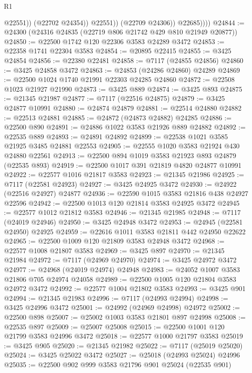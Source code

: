 \begin{lexlean}{R1}
\begin{coremodule}
                        @22551))
                    (@22702 @24354))
                  @22551))
              (@22709 @24306))
            @22685))))
@24844 := @24300 (@24316 @24835 (@22719 @806 @21742 @429 @810 @21949 @20877))
@24850 := @22500 @1742 @120 @22306 @3583 @24289 @3472
@24853 := @22358 @1741 @22304 @3583
@24854 := @20895 @22415
@24855 := @3425 @24854
@24856 := @22380 @22481
@24858 := @7117 (@24855 @24856)
@24860 := @3425 @24858 @3472
@24863 := @24853 (@24286 @24860) @24289
@24869 := @22500 @1024 @1740 @21991 @22303 @24285 @24860
@24872 := @22508 @1023 @21927 @21990
@24873 := @3425 @889
@24874 := @3425 @893
@24875 := @21345 @21987
@24877 := @7117 (@22516 @24875)
@24879 := @3425 @24877 @10991
@24880 := @24874 @24879
@24881 := @22514 @24880
@24882 := @22513 @24881
@24885 := @24872 (@24873 @24882) @24285
@24886 := @22500 @890
@24891 := @24886 @1022 @3583 @21926 @889 @24882
@24892 := @22535 @889
@24893 := @24891 @24892
@24899 := @22538 @1021 @3585 @21925 @3485 @24881 @22553
@24905 := @22555 @1020 @3583 @21924 @430 @24880 @22561
@24913 := @22500 @894 @1019 @3583 @21923 @893 @24879 (@22535 @893)
@24919 := @22500 @1017 @391 @21819 @4820 @24877 @10991
@24922 := @22577 @1016 @21817 @3583
@24923 := @21345 @21986
@24925 := @7117 (@22581 @24923)
@24927 := @3425 @24925 @3472
@24930 := @24922 (@22516 @24927) @24877
@24936 := @22590 @1015 @3583 @21816 @438 @24927 @22596
@24942 := @22500 @1013 @120 @21814 @3583 @24925 @3472
@24945 := @22577 @1012 @21812 @3583
@24946 := @21345 @21985
@24948 := @7117 (@24019 @24946)
@24950 := @3425 @24948 @3472
@24953 := @24945 (@22581 @24950) @24925
@24959 := @22616 @1011 @3583 @21811 @442 @24950 @22622
@24965 := @22500 @1009 @120 @21809 @3583 @24948 @3472
@24968 := @22577 @1008 @21807 @3583
@24969 := @3425 @897
@24970 := @21345 @21984
@24972 := @7117 (@24969 @24970)
@24974 := @3425 @24972 @3472
@24977 := @24968 (@24019 @24974) @24948
@24983 := @24052 @1007 @3583 @21806 @705 @24974 @24058
@24989 := @22500 @1005 @120 @21804 @3583 @24972 @3472
@24992 := @22577 @1004 @21802 @3583
@24993 := @3425 @901
@24994 := @21345 @21983
@24996 := @7117 (@24993 @24994)
@24998 := @3425 @24996 @3472
@25001 := @24992 (@24969 @24998) @24972
@25002 := @22500 @898
@25007 := @25002 @1003 @3583 @21801 @897 @24998
@25008 := @22535 @897
@25009 := @25007 @25008
@25015 := @22500 @1001 @120 @21799 @3583 @24996 @3472
@25018 := @22577 @1000 @21797 @3583
@25019 := @3425 @905
@25020 := @21345 @21982
@25022 := @7117 (@25019 @25020)
@25024 := @3425 @25022 @3472
@25027 := @25018 (@24993 @25024) @24996
@25035 := @22500 @902 @999 @3583 @21796 @901 @25024 (@22535 @901)

\end{coremodule}
\end{lexlean}
